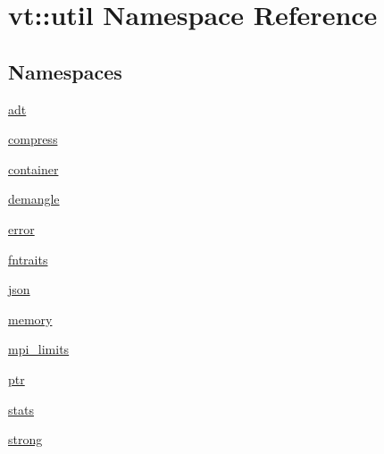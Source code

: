 \hypertarget{namespacevt_1_1util}{}\section{vt\+:\+:util Namespace Reference}
\label{namespacevt_1_1util}
\subsection*{Namespaces}
\begin{DoxyCompactItemize}
\item 
 \hyperlink{namespacevt_1_1util_1_1adt}{adt}
\item 
 \hyperlink{namespacevt_1_1util_1_1compress}{compress}
\item 
 \hyperlink{namespacevt_1_1util_1_1container}{container}
\item 
 \hyperlink{namespacevt_1_1util_1_1demangle}{demangle}
\item 
 \hyperlink{namespacevt_1_1util_1_1error}{error}
\item 
 \hyperlink{namespacevt_1_1util_1_1fntraits}{fntraits}
\item 
 \hyperlink{namespacevt_1_1util_1_1json}{json}
\item 
 \hyperlink{namespacevt_1_1util_1_1memory}{memory}
\item 
 \hyperlink{namespacevt_1_1util_1_1mpi__limits}{mpi\+\_\+limits}
\item 
 \hyperlink{namespacevt_1_1util_1_1ptr}{ptr}
\item 
 \hyperlink{namespacevt_1_1util_1_1stats}{stats}
\item 
 \hyperlink{namespacevt_1_1util_1_1strong}{strong}
\end{DoxyCompactItemize}
